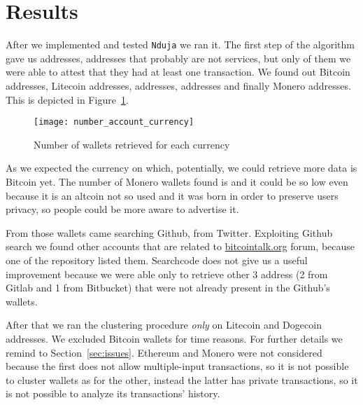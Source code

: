 \newcommand{\accountGitlab}{2}

\newcommand{\accountBitbucket}{1}


\section{Results} \label{results}
After we implemented and tested \texttt{Nduja} we ran it. The first step of the
algorithm gave us \startingNumberAllWallets{} addresses,
\startingNumberWalletsNotService{} addresses that probably are not services,
but only \startingNumberWalletsAtLeastOneTransaction{} of them we were able to
attest that they had at least one transaction. We found out \startingBTC{}
Bitcoin addresses, \startingLTC{} Litecoin addresses, \startingDOGE{}
addresses, \startingETH{} addresses and finally \startingXMR{} Monero
addresses. This is depicted in Figure~\ref{fig:numberaccountcurrency}.
\begin{figure}[H]
\centering
\texttt{[image: number\_account\_currency]}
\caption{Number of wallets retrieved for each currency}
\label{fig:numberaccountcurrency}
\end{figure}

As we expected the currency on which, potentially, we could retrieve more data
is Bitcoin yet. The number of Monero wallets found is \startingXMR{} and it
could be so low even because it is an altcoin not so used and it was born in
order to preserve users privacy, so people could be more aware to advertise it.

From those wallets \accountGithub{} came searching Github, \accountTwitter{}
from Twitter. Exploiting Github search we found other \accountBitcointalk{}
accounts that are related to \url{bitcointalk.org} forum, because one of the
repository listed them. Searchcode does not give us a useful improvement
because we were able only to retrieve other 3 address (\accountGitlab{} from
Gitlab and \accountBitbucket{} from Bitbucket) that were not already present in
the Github's wallets. 

After that we ran the clustering procedure \emph{only} on Litecoin and Dogecoin
addresses. We excluded Bitcoin wallets for time reasons. For further details we
remind to Section~\ref{sec:issues}. Ethereum and Monero were not considered
because the first does not allow multiple-input transactions, so it is not
possible to cluster wallets as for the other, instead the latter has private
transactions, so it is not possible to analyze its transactions' history. 

